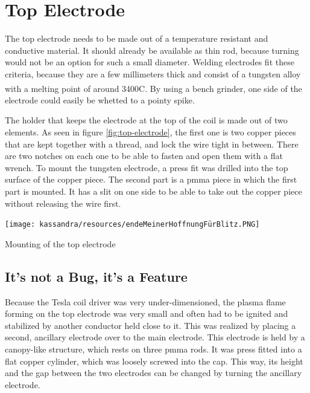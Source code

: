 \newpage
\section{Top Electrode}

The top electrode needs to be made out of a temperature resistant and conductive material. It should already be available as thin rod, because turning would not be an option for such a small diameter. Welding electrodes fit these criteria, because they are a few millimeters thick and consist of a tungsten alloy with a melting point of around 3400\textdegree C\textsuperscript{}. By using a bench grinder, one side of the electrode could easily be whetted to a pointy spike.

The holder that keeps the electrode at the top of the coil is made out of two elements. As seen in figure \ref{fig:top-electrode}, the first one is two copper pieces that are kept together with a thread, and lock the wire tight in between. There are two notches on each one to be able to fasten and open them with a flat wrench. To mount the tungsten electrode, a press fit was drilled into the top surface of the copper piece. The second part is a \gls{pmma} piece in which the first part is mounted. It has a slit on one side to be able to take out the copper piece without releasing the wire first.

\begin{marginfigure}[-8cm]
    \centering
    \texttt{[image: kassandra/resources/endeMeinerHoffnungFürBlitz.PNG]}
    \caption{Mounting of the top electrode}
    \label{fig:top-electrode}
\end{marginfigure}

\subsection{It's not a Bug, it's a Feature}

Because the Tesla coil driver was very under-dimensioned, the plasma flame forming on the top electrode was very small and often had to be ignited and stabilized by another conductor held close to it. This was realized by placing a second, ancillary electrode over to the main electrode. This electrode is held by a canopy-like structure, which rests on three \gls{pmma} rods. It was press fitted into a flat copper cylinder, which was loosely screwed into the cap. This way, its height and the gap between the two electrodes can be changed by turning the ancillary electrode.

